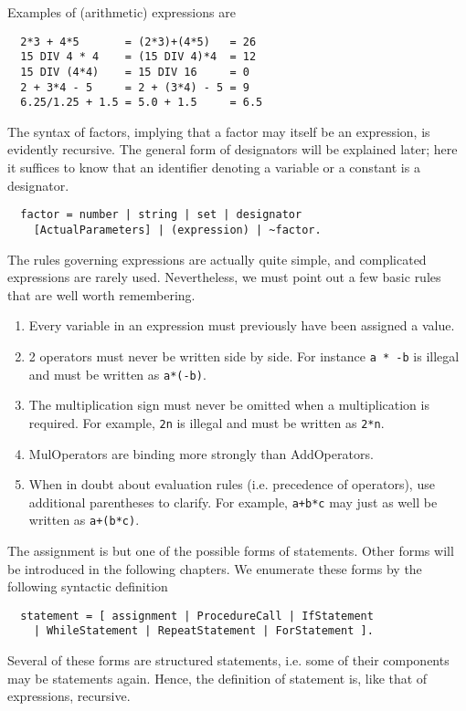 Examples of (arithmetic) expressions are
\begin{verbatim}
  2*3 + 4*5       = (2*3)+(4*5)   = 26
  15 DIV 4 * 4    = (15 DIV 4)*4  = 12
  15 DIV (4*4)    = 15 DIV 16     = 0
  2 + 3*4 - 5     = 2 + (3*4) - 5 = 9
  6.25/1.25 + 1.5 = 5.0 + 1.5     = 6.5
\end{verbatim}
The syntax of factors, implying that a factor may itself be an expression, is evidently recursive. The
general form of designators will be explained later; here it suffices to know that an identifier
denoting a variable or a constant is a designator.
\begin{verbatim}
  factor = number | string | set | designator
    [ActualParameters] | (expression) | ~factor.
\end{verbatim}
The rules governing expressions are actually quite simple, and complicated expressions are rarely
used. Nevertheless, we must point out a few basic rules that are well worth remembering.
\begin{enumerate}
  \item Every variable in an expression must previously have been assigned a value.
  \item 2 operators must never be written side by side. For instance \verb|a * -b| is illegal and
    must be written as \verb|a*(-b)|.
  \item The multiplication sign must never be omitted when a multiplication is required. For
    example, \verb|2n| is illegal and must be written as \verb|2*n|.
  \item MulOperators are binding more strongly than AddOperators.
  \item When in doubt about evaluation rules (i.e. precedence of operators), use additional
    parentheses to clarify. For example, \verb|a+b*c| may just as well be written as
    \verb|a+(b*c)|.
\end{enumerate}
The assignment is but one of the possible forms of statements. Other forms will be introduced in the
following chapters. We enumerate these forms by the following syntactic definition
\begin{verbatim}
  statement = [ assignment | ProcedureCall | IfStatement
    | WhileStatement | RepeatStatement | ForStatement ].
\end{verbatim}
Several of these forms are structured statements, i.e. some of their components may be statements
again. Hence, the definition of statement is, like that of expressions, recursive.

